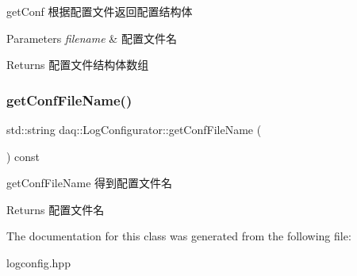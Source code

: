 get\+Conf 根据配置文件返回配置结构体 


\begin{DoxyParams}{Parameters}
{\em filename} & 配置文件名\\
\hline
\end{DoxyParams}
\begin{DoxyReturn}{Returns}
配置文件结构体数组 
\end{DoxyReturn}
\mbox{\label{classdaq_1_1LogConfigurator_ab1053721ed0940c15397fe0dbf42560c}} 
\subsubsection{\texorpdfstring{get\+Conf\+File\+Name()}{getConfFileName()}}
{\footnotesize\ttfamily std\+::string daq\+::\+Log\+Configurator\+::get\+Conf\+File\+Name (\begin{DoxyParamCaption}{ }\end{DoxyParamCaption}) const}



get\+Conf\+File\+Name 得到配置文件名 

\begin{DoxyReturn}{Returns}
配置文件名 
\end{DoxyReturn}


The documentation for this class was generated from the following file\+:\begin{DoxyCompactItemize}
\item 
logconfig.\+hpp\end{DoxyCompactItemize}

